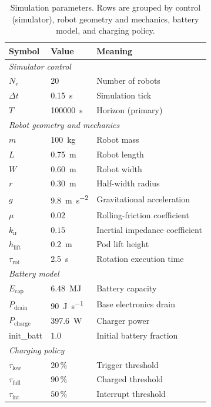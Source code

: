 \documentclass[conference]{IEEEtran}
\begin{document}
\begin{table}[t]
  \centering
  \caption{Simulation parameters. Rows are grouped by control (simulator), robot geometry and mechanics, battery model, and charging policy.}
  \label{tab:params}
  \small
  \begin{tabular}{lll}
    \toprule
    Symbol & Value & Meaning \\
    \midrule
    \multicolumn{3}{l}{\emph{Simulator control}} \\
    $N_r$                & 20                            & Number of robots \\
    $\Delta t$           & \SI{0.15}{\second}            & Simulation tick \\
    $T$                  & \SI{100000}{\second}          & Horizon (primary) \\
    \midrule
    \multicolumn{3}{l}{\emph{Robot geometry and mechanics}} \\
    $m$                  & \SI{100}{\kilo\gram}          & Robot mass \\
    $L$                  & \SI{0.75}{\meter}             & Robot length \\
    $W$                  & \SI{0.60}{\meter}             & Robot width \\
    $r$                  & \SI{0.30}{\meter}             & Half-width radius \\
    $g$                  & \SI{9.8}{\meter\per\second\squared} & Gravitational acceleration \\
    $\mu$                & $0.02$                        & Rolling-friction coefficient \\
    $k_\text{ir}$        & $0.15$                        & Inertial impedance coefficient \\
    $h_\text{lift}$      & \SI{0.2}{\meter}              & Pod lift height \\
    $\tau_\text{rot}$    & \SI{2.5}{\second}             & Rotation execution time \\
    \midrule
    \multicolumn{3}{l}{\emph{Battery model}} \\
    $E_\text{cap}$       & \SI{6.48}{\mega\joule}        & Battery capacity \\
    $P_\text{drain}$     & \SI{90}{\joule\per\second}    & Base electronics drain \\
    $P_\text{charge}$    & \SI{397.6}{\watt}             & Charger power \\
    init\_batt           & $1.0$                         & Initial battery fraction \\
    \midrule
    \multicolumn{3}{l}{\emph{Charging policy}} \\
    $\tau_\text{low}$    & $20\,\%$                      & Trigger threshold \\
    $\tau_\text{full}$   & $90\,\%$                      & Charged threshold \\
    $\tau_\text{int}$    & $50\,\%$                      & Interrupt threshold \\
    \bottomrule
  \end{tabular}
\end{table}
\end{document}
